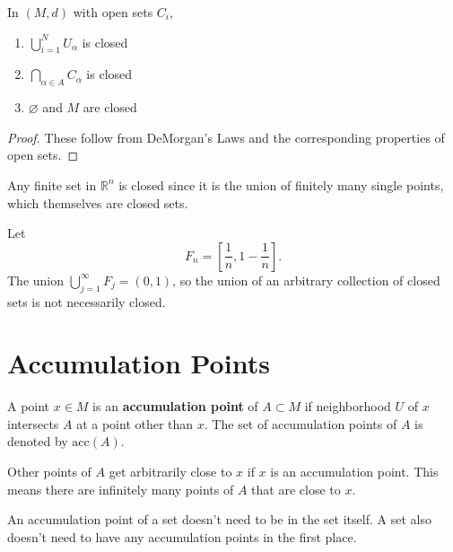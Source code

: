 \documentclass[twoside,10pt]{report}
\begin{document}
\begin{prop}
        In $(M,d)$ with open sets $C_i$,
        \begin{enumerate}
                \item $\bigcup_{i=1}^N U_\alpha$ is closed
                \item $\bigcap_{\alpha\in A} C_\alpha$ is closed
                \item $\varnothing$ and $M$ are closed
        \end{enumerate}
\end{prop}
\begin{proof}
	These follow from DeMorgan's Laws and the corresponding properties of open sets.
\end{proof}

\begin{ex}[]
Any finite set in $\mathbb{R}^n$ is closed since it is the union of finitely many single points, which themselves are closed sets.
\end{ex}

\begin{ex}[]
	Let \[F_n = \left[\frac{1}{n}, 1-\frac{1}{n}\right] .\] The union $\bigcup_{j=1}^\infty F_j = (0,1)$, so the union of an arbitrary collection of closed sets is not necessarily closed.
\end{ex}


\section{Accumulation Points}
\begin{defn}[]
	A point $x \in M$ is an \textbf{accumulation point} of $A \subset M$ if neighborhood $U$ of $x$ intersects $A$ at a point other than $x$. The set of accumulation points of $A$ is denoted by $\text{acc}(A)$.
\end{defn}

Other points of $A$ get arbitrarily close to $x$ if $x$ is an accumulation point. This means there are infinitely many points of $A$ that are close to $x$.

An accumulation point of a set doesn't need to be in the set itself. A set also doesn't need to have any accumulation points in the first place.
\end{document}
